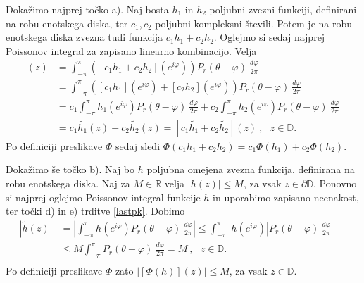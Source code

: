 \documentclass[mat1, tisk]{fmfdelo}
\begin{document}
    \begin{dokaz}
           Dokažimo najprej točko a). Naj bosta $h_1$ in $h_2$ poljubni zvezni funkciji, definirani na robu enotskega diska, ter $c_1, c_2$ poljubni kompleksni števili. 
           Potem je na robu enotskega diska zvezna tudi funkcija $c_1 h_1 + c_2 h_2$. Oglejmo si sedaj najprej Poissonov integral za zapisano linearno kombinacijo. Velja
           \begin{align*}
               [\widetilde{c_1 h_1 + c_2 h_2}](z) &= \int_{-\pi}^{\pi}{\left([c_1 h_1 + c_2 h_2](e^{i\varphi}) \right)P_r(\theta - \varphi)~\frac{d\varphi}{2 \pi}}\\ 
               & = \int_{-\pi}^{\pi}{\left([c_1 h_1](e^{i\varphi}) + [c_2 h_2](e^{i\varphi})\right)P_r(\theta - \varphi)~\frac{d\varphi}{2 \pi}}\\
               & = c_1\int_{-\pi}^{\pi}{h_1(e^{i\varphi})P_r(\theta - \varphi)~\frac{d\varphi}{2 \pi}} + c_2\int_{-\pi}^{\pi}{h_2(e^{i\varphi})P_r(\theta - \varphi)~\frac{d\varphi}{2 \pi}}\\
               & = c_1 \widetilde{h_1}(z) + c_2 \widetilde{h_2}(z) = [c_1 \widetilde{h_1} + c_2 \widetilde{h_2}](z)~,~~~z \in \mathbb{D}.
           \end{align*}
           Po definiciji preslikave $\Phi$ sedaj sledi $\Phi(c_1 h_1 + c_2 h_2) = c_1 \Phi(h_1) + c_2 \Phi(h_2)$.
           
           Dokažimo še točko b). Naj bo $h$ poljubna omejena zvezna funkcija, definirana na robu enotskega diska. Naj za $M \in \mathbb{R}$ velja $|h(z)| \leq M$, za vsak $z \in \partial \mathbb{D}$.
           Ponovno si najprej oglejmo Poissonov integral funkcije $h$ in uporabimo zapisano neenakost, ter točki d) in e) trditve \ref{lastpk}. Dobimo
           \begin{align*}
               \left|\widetilde{h}(z)\right| &= \left| \int_{-\pi}^{\pi}{h(e^{i\varphi}) P_r(\theta - \varphi)~\frac{d\varphi}{2 \pi}} \right| \leq \int_{-\pi}^{\pi}{\left|h(e^{i\varphi}) \right|P_r(\theta - \varphi)~\frac{d\varphi}{2 \pi}} \\ 
               &\leq M \int_{-\pi}^{\pi}{P_r(\theta - \varphi)~\frac{d\varphi}{2 \pi}} = M~,~~~z \in \mathbb{D}.& & \\
           \end{align*}
           Po definiciji preslikave $\Phi$ zato $|[\Phi(h)](z)| \leq M$, za vsak $z \in \mathbb{D}$.
    \end{dokaz}
\end{document}
